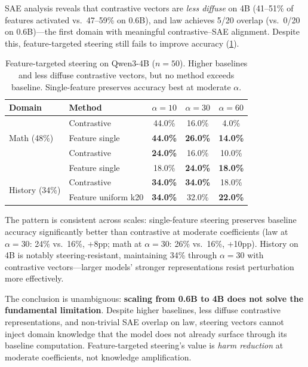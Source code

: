 \documentclass[11pt,a4paper]{article}
\begin{document}
SAE analysis reveals that contrastive vectors are \textit{less diffuse} on 4B (41--51\% of features activated vs.\ 47--59\% on 0.6B), and law achieves 5/20 overlap (vs.\ 0/20 on 0.6B)---the first domain with meaningful contrastive--SAE alignment. Despite this, feature-targeted steering still fails to improve accuracy (\cref{tab:feature_targeted_4b}).

\begin{table}[H]
\centering
\caption{Feature-targeted steering on Qwen3-4B ($n=50$). Higher baselines and less diffuse contrastive vectors, but no method exceeds baseline. Single-feature preserves accuracy best at moderate $\alpha$.}
\label{tab:feature_targeted_4b}
\small
\begin{tabular}{llccc}
\toprule
\textbf{Domain} & \textbf{Method} & $\alpha=10$ & $\alpha=30$ & $\alpha=60$ \\
\midrule
\multirow{3}{*}{Math (48\%)}
  & Contrastive       & 44.0\% & 16.0\% & 4.0\% \\
  & Feature single    & \textbf{44.0\%} & \textbf{26.0\%} & \textbf{14.0\%} \\
\midrule
\multirow{3}{*}{Law (22\%)}
  & Contrastive       & \textbf{24.0\%} & 16.0\% & 10.0\% \\
  & Feature single    & 18.0\% & \textbf{24.0\%} & \textbf{18.0\%} \\
\midrule
\multirow{3}{*}{History (34\%)}
  & Contrastive       & \textbf{34.0\%} & \textbf{34.0\%} & 18.0\% \\
  & Feature uniform k20 & \textbf{34.0\%} & 32.0\% & \textbf{22.0\%} \\
\bottomrule
\end{tabular}
\end{table}

The pattern is consistent across scales: single-feature steering preserves baseline accuracy significantly better than contrastive at moderate coefficients (law at $\alpha=30$: 24\% vs.\ 16\%, +8pp; math at $\alpha=30$: 26\% vs.\ 16\%, +10pp). History on 4B is notably steering-resistant, maintaining 34\% through $\alpha=30$ with contrastive vectors---larger models' stronger representations resist perturbation more effectively.

The conclusion is unambiguous: \textbf{scaling from 0.6B to 4B does not solve the fundamental limitation}. Despite higher baselines, less diffuse contrastive representations, and non-trivial SAE overlap on law, steering vectors cannot inject domain knowledge that the model does not already surface through its baseline computation. Feature-targeted steering's value is \textit{harm reduction} at moderate coefficients, not knowledge amplification.
\end{document}
